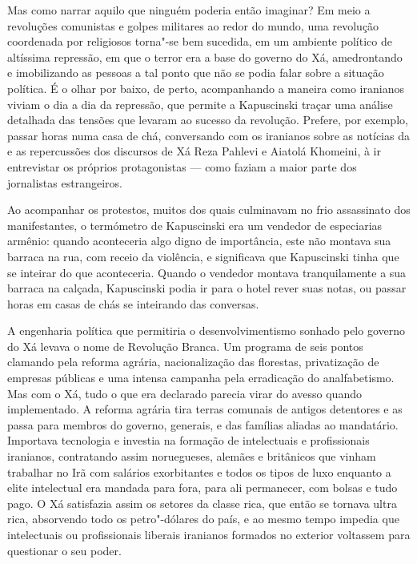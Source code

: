 Mas como narrar aquilo que ninguém poderia então imaginar? Em meio a
revoluções comunistas e golpes militares ao redor do mundo, uma
revolução coordenada por religiosos torna"-se bem sucedida, em um
ambiente político de altíssima repressão, em que o terror era a base do
governo do Xá, amedrontando e imobilizando as pessoas a tal ponto que
não se podia falar sobre a situação política. É o olhar por baixo, de
perto, acompanhando a maneira como iranianos viviam o dia a dia da
repressão, que permite a Kapuscinski traçar uma análise detalhada das
tensões que levaram ao sucesso da revolução. Prefere, por exemplo,
passar horas numa casa de chá, conversando com os iranianos sobre as
notícias da  e as repercussões dos discursos de Xá Reza Pahlevi e
Aiatolá Khomeini, à ir entrevistar os próprios protagonistas --- como
faziam a maior parte dos jornalistas estrangeiros.

Ao acompanhar os protestos, muitos dos quais culminavam no frio
assassinato dos manifestantes, o termómetro de Kapuscinski era um
vendedor de especiarias armênio: quando aconteceria algo digno de
importância, este não montava sua barraca na rua, com receio da
violência, e significava que Kapuscinski tinha que se inteirar do que
aconteceria. Quando o vendedor montava tranquilamente a sua barraca na
calçada, Kapuscinski podia ir para o hotel rever suas notas, ou passar
horas em casas de chás se inteirando das conversas.

A engenharia política que permitiria o desenvolvimentismo sonhado pelo
governo do Xá levava o nome de Revolução Branca. Um programa de seis
pontos clamando pela reforma agrária, nacionalização das florestas,
privatização de empresas públicas e uma intensa campanha pela
erradicação do analfabetismo. Mas com o Xá, tudo o que era declarado
parecia virar do avesso quando implementado. A reforma agrária tira
terras comunais de antigos detentores e as passa para membros do
governo, generais, e das famílias aliadas ao mandatário. Importava
tecnologia e investia na formação de intelectuais e profissionais
iranianos, contratando assim noruegueses, alemães e britânicos que
vinham trabalhar no Irã com salários exorbitantes e todos os tipos de
luxo enquanto a elite intelectual era mandada para fora, para ali
permanecer, com bolsas e tudo pago. O Xá satisfazia assim os setores da
classe rica, que então se tornava ultra rica, absorvendo todo os
petro"-dólares do país, e ao mesmo tempo impedia que intelectuais ou
profissionais liberais iranianos formados no exterior voltassem para
questionar o seu poder.

